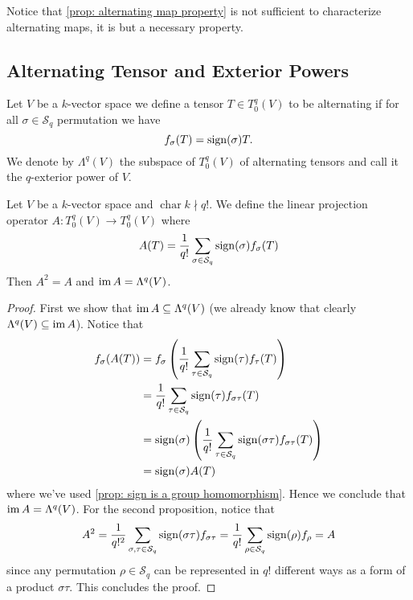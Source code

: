 \begin{remark}
  Notice that \cref{prop: alternating map property} is not sufficient to
  characterize alternating maps, it is but a necessary property.
\end{remark}

\subsection{Alternating Tensor and Exterior Powers}

\begin{definition}
  \label{def: alternating tensor}
  Let \(V\) be a \(k\)-vector space we define a tensor \(T \in T_0^q(V)\) to be
  alternating if for all \(\sigma \in \mathcal S_q\) permutation we have
  \[
    f_\sigma(T) = \operatorname{sign}(\sigma) T.
  \]
  We denote by \(\Lambda^q(V)\) the subspace of \(T_0^q(V)\) of alternating
  tensors and call it the \(q\)-exterior power of \(V\).
\end{definition}

\begin{proposition}
  \label{prop: alternating projection}
  Let \(V\) be a \(k\)-vector space and \(\operatorname{char} k \nmid q!\). We
  define the linear projection operator \(A: T_0^q(V) \to T_0^q(V)\) where
  \[
    A(T) = \frac{1}{q!} \sum_{\sigma \in \mathcal S_q} \operatorname{sign}(\sigma)
    f_\sigma(T)
  \]
  Then \(A^2 = A\) and \(\operatorname{im} A = \Lambda^q(V)\).
\end{proposition}

\begin{proof}
  First we show that \(\operatorname{im} A \subseteq \Lambda^q(V)\) (we already know that
  clearly \(\Lambda^q(V) \subseteq \operatorname{im} A\)). Notice that
  \begin{align*}
    f_\sigma(A(T))
    &= f_\sigma \left( \frac 1 {q!} \sum_{\tau \in \mathcal S_q}
    \operatorname{sign}(\tau) f_\tau(T) \right) \\
    &= \frac 1 {q!} \sum_{\tau \in \mathcal S_q} \operatorname{sign}(\tau)
    f_{\sigma \tau}(T) \\
    &= \operatorname{sign}(\sigma) \left( \frac 1 {q!} \sum_{\tau \in \mathcal
    S_q} \operatorname{sign}(\sigma \tau) f_{\sigma \tau}(T) \right) \\
    &= \operatorname{sign}(\sigma) A(T)
  \end{align*}
  where we've used \cref{prop: sign is a group homomorphism}. Hence we conclude
  that \(\operatorname{im} A = \Lambda^q(V)\). For the second proposition, notice that
  \[
    A^2 = \frac 1 {q!^2} \sum_{\sigma, \tau \in \mathcal S_q}
    \operatorname{sign}(\sigma \tau) f_{\sigma \tau}
    = \frac 1 {q!} \sum_{\rho \in \mathcal S_q} \operatorname{sign}(\rho)
    f_\rho = A
  \]
  since any permutation \(\rho \in \mathcal S_q\) can be represented in \(q!\)
  different ways as a form of a product \(\sigma \tau\). This concludes the
  proof.
\end{proof}

